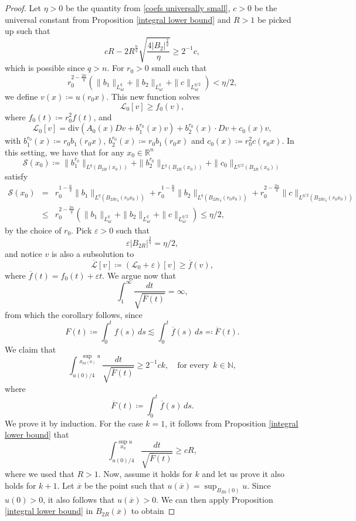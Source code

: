 \documentclass[10pt,a4paper]{amsart}
\begin{document}
\begin{proof}
Let $\eta>0$ be the quantity from \eqref{coefs universally small}, $c>0$ be the universal constant from Proposition \ref{integral lower bound} and $R>1$ be picked up such that
$$
    cR - 2R^{\frac{n}{q}}\sqrt{\frac{4|B_2|^{\frac{2}{q}}}{\eta}} \geq 2^{-1}c,
$$
which is possible since $q > n$. For $r_0>0$ small such that
$$
    r_0^{2 - \frac{2n}{q}}\left(\|b_1\|_{L^q_{ul}} + \|b_2\|_{L^q_{ul}} + \|c\|_{L^{q/2}_{ul}}  \right) < \eta/2,
$$
we define $v(x) \coloneqq u(r_0 x)$. This new function solves
$$
    \mathcal{L}_0[v] \geq f_0(v),
$$
where $f_0(t) \coloneqq r_0^2 f(t)$, and
$$
    \mathcal{L}_0[v] = \mbox{div}(A_0(x)Dv + b_1^{r_0}(x)v) + b_2^{r_0}(x)\cdot Dv + c_0(x)v,
$$
with $b_1^{r_0}(x) \coloneqq r_0 b_1(r_0 x)$, $b_2^{r_0}(x) \coloneqq r_0 b_1(r_0 x)$ and $c_0(x) \coloneqq r_0^2c(r_0 x)$. In this setting, we have that for any $x_0 \in \mathbb{R}^n$
$$
    \mathcal{S}(x_0) \coloneqq \|b_1^{r_0}\|_{L^{q}(B_{2R}(x_0))} + \|b_2^{r_0}\|_{L^{q}(B_{2R}(x_0))} + \|c_0\|_{L^{q/2}(B_{2R}(x_0))}
$$
satisfy
\begin{eqnarray*}
    \mathcal{S}(x_0) & = & r_0^{1-\frac{n}{q}}\|b_1\|_{L^{q}(B_{2Rr_0}(r_0x_0))} + r_0^{1-\frac{n}{q}}\|b_2\|_{L^{q}(B_{2Rr_0}(r_0x_0))} + r_0^{2-\frac{2n}{q}}\|c\|_{L^{q/2}(B_{2Rr_0}(r_0x_0))}\\
    & \leq & r_0^{2-\frac{2n}{q}}\left(\|b_1\|_{L^{q}_{ul}}+\|b_2\|_{L^{q}_{ul}}+\|c\|_{L^{q/2}_{ul}}\right) \leq \eta/2,
\end{eqnarray*}
by the choice of $r_0$. Pick $\varepsilon>0$ such that 
$$
    \varepsilon |B_{2R}|^{\frac{2}{q}} = \eta/2,
$$
and notice $v$ is also a subsolution to
$$
   \overline{\mathcal{L}}[v] \coloneqq \left(\mathcal{L}_0+\varepsilon\right)[v] \geq \overline{f}(v),
$$
where $\overline{f}(t) = f_0(t) + \varepsilon t$. We argue now that
$$
    \int_{1}^\infty \frac{dt}{\sqrt{\overline{F}(t)}} = \infty,
$$
from which the corollary follows, since 
$$
    F(t) \coloneqq \int_{0}^tf(s)\,ds \lesssim \int_{0}^t\overline{f}(s)\,ds \eqqcolon \overline{F}(t).
$$
We claim that
$$
	\int_{u(0)/4}^{\sup_{B_{Rk}(0)}u}\frac{dt}{\sqrt{\overline{F}(t)}} \geq 2^{-1}ck, \quad \text{for every }\, k \in \mathbb{N},
$$
where
$$
    \overline{F}(t) \coloneqq \int_{0}^t\overline{f}(s)\,ds.
$$
We prove it by induction. For the case $k=1$, it follows from Proposition \ref{integral lower bound} that
$$
    \int_{u(0)/4}^{\sup_{B_R}u}\frac{dt}{\sqrt{\overline{F}(t)}} \geq cR,
$$
where we used that $R>1$. Now, assume it holds for $k$ and let us prove it also holds for $k+1$. Let $\overline{x}$ be the point such that $u(\overline{x}) = \sup_{B_{Rk}(0)} u$. Since $u(0) > 0$, it also follows that $u(\overline{x}) > 0$. We can then apply Proposition \ref{integral lower bound} in $B_{2R}(\overline{x})$ to obtain

\end{proof}
\end{document}
